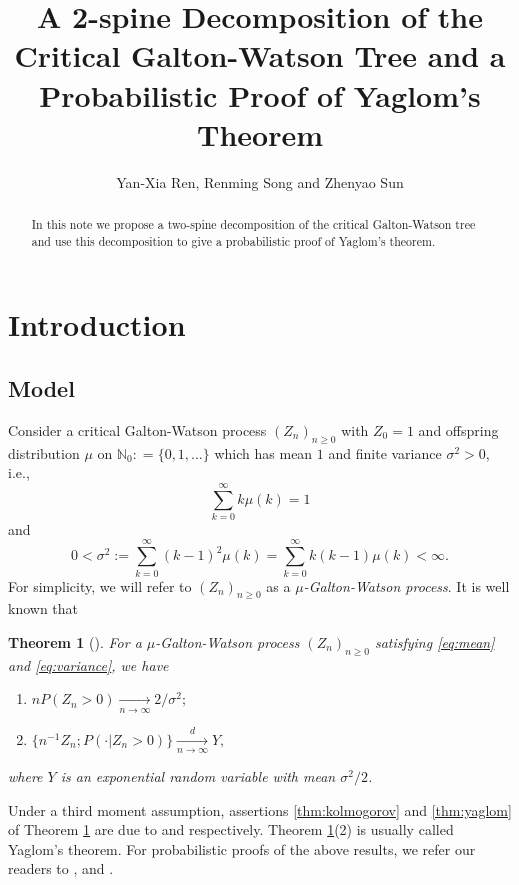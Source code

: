 \documentclass[12pt,a4paper]{amsart}
\title[A 2-spine decomposition and Yaglom's theorem]
{\large A 2-spine Decomposition of the Critical Galton-Watson Tree and a Probabilistic Proof of Yaglom's Theorem}
\author{Yan-Xia Ren, Renming Song and Zhenyao Sun}
\newtheorem{thm}{Theorem}[section]
\numberwithin{equation}{section}
\begin{document}
\begin{abstract}
	In this note  we propose a two-spine decomposition of the critical Galton-Watson tree and use this decomposition to give a probabilistic proof of Yaglom's theorem.
\end{abstract}
\maketitle	
\section{Introduction}
\subsection{Model}
\label{sec:model}
	Consider a critical Galton-Watson process
	$(Z_n)_{n\ge 0}$ 	with $Z_0 = 1$
	and offspring distribution $\mu$ on $\mathbb N_0 : = \{0,1,\dots\}$ which has mean $1$ and finite variance $\sigma^2>0$, i.e.,
\begin{equation}\label{eq:mean}
 \sum_{k=0}^\infty k \mu(k)	=1
\end{equation}
	and
\begin{equation}\label{eq:variance}
	0	
	<	\sigma^2
	:=	\sum_{k=0}^\infty  (k-1)^2 \mu(k)
	=	\sum_{k=0}^\infty k(k-1) \mu(k)
	<	\infty.
\end{equation}
	For simplicity,  
	we will refer to $(Z_n)_{n\geq 0}$ as a  \emph{$\mu$-Galton-Watson process}.
	It is well known that
\begin{thm}[\cite{kesten1966galton}] \label{thm: Kolmogrov and Yaglom theorem}
	For a $\mu$-Galton-Watson process $(Z_n)_{n\geq 0}$
	satisfying \eqref{eq:mean} and \eqref{eq:variance}, we have
\begin{enumerate}
\item \label{thm:kolmogorov}
	 $n P (Z_n>0) \xrightarrow[n \to \infty]{} 2/\sigma^2;$
\item \label{thm:yaglom}
	$\{n^{-1}Z_n; P(\cdot | Z_n>0)\}\xrightarrow[n \to \infty]{d} Y,$
\end{enumerate}
	where $Y$ is an exponential random variable with mean $\sigma^2/2$.
\end{thm}

	Under a third moment assumption, assertions \eqref{thm:kolmogorov} and \eqref{thm:yaglom} of Theorem \ref{thm: Kolmogrov and Yaglom theorem} are due to \cite{kolmogorov1938losung} and \cite{yaglom1947certain} respectively.
	Theorem \ref{thm: Kolmogrov and Yaglom theorem}(2) is usually called Yaglom's theorem.
	For probabilistic proofs of the above results, we refer our readers to
\cite{geiger1999elementary}, \cite{geiger2000new} and \cite{lyons1995conceptual}.
\end{document}
